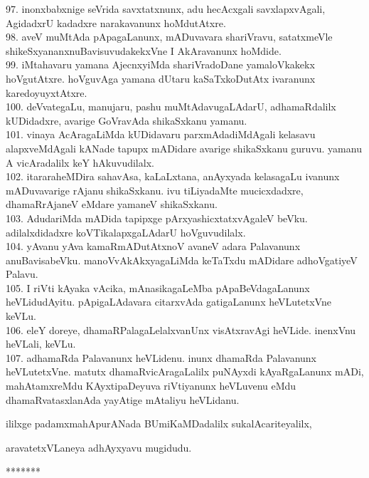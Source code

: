 \documentclass{article}
\begin{document}
97. inonxbabxnige seVrida savxtatxnunx, adu hecAcxgali savxlapxvAgali, AgidadxrU kadadxre narakavanunx hoMdutAtxre.\\
98. aveV muMtAda pApagaLanunx, mADuvavara shariVravu, satatxmeVle shikeSxyananxnuBavisuvudakekxVne I AkAravanunx hoMdide.\\
99. iMtahavaru yamana AjecnxyiMda shariVradoDane yamaloVkakekx hoVgutAtxre. hoVguvAga yamana dUtaru kaSaTxkoDutAtx ivaranunx karedoyuyxtAtxre.\\
100. deVvategaLu, manujaru, pashu muMtAdavugaLAdarU, adhamaRdalilx kUDidadxre, avarige GoVravAda shikaSxkanu yamanu.\\
101. vinaya AcAragaLiMda kUDidavaru parxmAdadiMdAgali kelasavu alapxveMdAgali kANade tapupx mADidare avarige shikaSxkanu guruvu. yamanu A vicAradalilx keY hAkuvudilalx.\\
102. itararaheMDira sahavAsa, kaLaLxtana, anAyxyada kelasagaLu ivanunx mADuvavarige rAjanu shikaSxkanu. ivu tiLiyadaMte mucicxdadxre, dhamaRrAjaneV eMdare yamaneV shikaSxkanu.\\
103. AdudariMda mADida tapipxge pArxyashicxtatxvAgaleV beVku. adilalxdidadxre koVTikalapxgaLAdarU hoVguvudilalx.\\
104. yAvanu yAva kamaRmADutAtxnoV avaneV adara Palavanunx anuBavisabeVku. manoVvAkAkxyagaLiMda keTaTxdu mADidare adhoVgatiyeV Palavu.\\
105. I riVti kAyaka vAcika, mAnasikagaLeMba pApaBeVdagaLanunx heVLidudAyitu. pApigaLAdavara citarxvAda gatigaLanunx heVLutetxVne keVLu.\\
106. eleY doreye, dhamaRPalagaLelalxvanUnx visAtxravAgi heVLide. inenxVnu heVLali, keVLu.\\
107. adhamaRda Palavanunx heVLidenu. inunx dhamaRda Palavanunx heVLutetxVne. matutx dhamaRvicAragaLalilx puNAyxdi kAyaRgaLanunx mADi, mahAtamxreMdu KAyxtipaDeyuva riVtiyanunx heVLuvenu eMdu dhamaRvatasxlanAda yayAtige mAtaliyu heVLidanu.\\

\begin{center}
ililxge padamxmahApurANada BUmiKaMDadalilx sukalAcariteyalilx,
\end{center}

\begin{center}
aravatetxVLaneya adhAyxyavu mugidudu.
\end{center}

\begin{center}
*******
\end{center}
\end{document}
